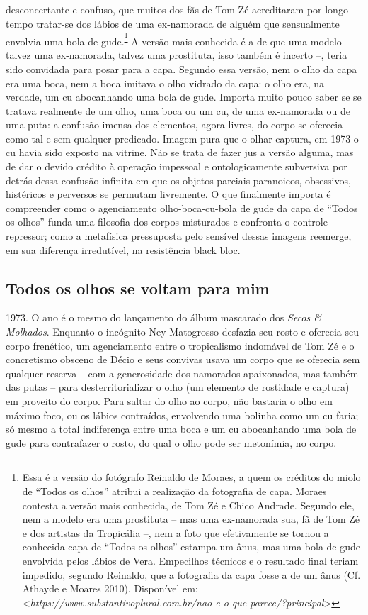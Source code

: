 desconcertante e confuso, que muitos dos fãs de Tom Zé acreditaram por
longo tempo tratar-se dos lábios de uma ex-namorada de alguém que
sensualmente envolvia uma bola de gude.\textsuperscript{\footnote{Essa é
  a versão do fotógrafo Reinaldo de Moraes, a quem os créditos do miolo
  de ``Todos os olhos'' atribui a realização da fotografia de capa.
  Moraes contesta a versão mais conhecida, de Tom Zé e Chico Andrade.
  Segundo ele, nem a modelo era uma prostituta -- mas uma ex-namorada
  sua, fã de Tom Zé e dos artistas da Tropicália --, nem a foto que
  efetivamente se tornou a conhecida capa de ``Todos os olhos'' estampa
  um ânus, mas uma bola de gude envolvida pelos lábios de Vera.
  Empecilhos técnicos e o resultado final teriam impedido, segundo
  Reinaldo, que a fotografia da capa fosse a de um ânus (Cf. Athayde e
  Moares 2010). Disponível em:
  \textless{}{\emph{https://www.substantivoplural.com.br/nao-e-o-que-parece/?principal}}\textgreater{}}}
A versão mais conhecida é a de que uma modelo -- talvez uma ex-namorada,
talvez uma prostituta, isso também é incerto --, teria sido convidada
para posar para a capa. Segundo essa versão, nem o olho da capa era uma
boca, nem a boca imitava o olho vidrado da capa: o olho era, na verdade,
um cu abocanhando uma bola de gude. Importa muito pouco saber se se
tratava realmente de um olho, uma boca ou um cu, de uma ex-namorada ou
de uma puta: a confusão imensa dos elementos, agora livres, do corpo se
oferecia como tal e sem qualquer predicado. Imagem pura que o olhar
captura, em 1973 o cu havia sido exposto na vitrine. Não se trata de
fazer jus a versão alguma, mas de dar o devido crédito à operação
impessoal e ontologicamente subversiva por detrás dessa confusão
infinita em que os objetos parciais paranoicos, obsessivos, histéricos e
perversos se permutam livremente. O que finalmente importa é compreender
como o agenciamento olho-boca-cu-bola de gude da capa de ``Todos os
olhos'' funda uma filosofia dos corpos misturados e confronta o controle
repressor; como a metafísica pressuposta pelo sensível dessas imagens
reemerge, em sua diferença irredutível, na resistência black bloc.

\subsection{Todos os olhos se voltam para mim}

1973. O ano é o
mesmo do lançamento do álbum mascarado dos \emph{Secos \& Molhados}.
Enquanto o incógnito Ney Matogrosso desfazia seu rosto e oferecia seu
corpo frenético, um agenciamento entre o tropicalismo indomável de Tom
Zé e o concretismo obsceno de Décio e seus convivas usava um corpo que
se oferecia sem qualquer reserva -- com a generosidade dos namorados
apaixonados, mas também das putas -- para desterritorializar o olho (um
elemento de rostidade e captura) em proveito do corpo. Para saltar do
olho ao corpo, não bastaria o olho em máximo foco, ou os lábios
contraídos, envolvendo uma bolinha como um cu faria; só mesmo a total
indiferença entre uma boca e um cu abocanhando uma bola de gude para
contrafazer o rosto, do qual o olho pode ser metonímia, no corpo.

